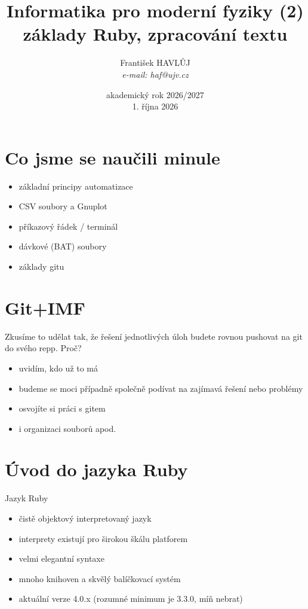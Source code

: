 \documentclass{beamer}
\title[IMF (2)]{Informatika pro moderní fyziky (2)\\základy Ruby, zpracování textu}
\author[Franti\v{s}ek HAVL\r{U}J, ORF ÚJV Řež]{Franti\v{s}ek HAVL\r{U}J\\{\scriptsize \emph{e-mail: haf@ujv.cz}}}
\date{akademický rok 2026/2027\\1. října 2026}
\institute[ORF ÚJV Řež]
{ÚJV Řež\\oddělení Reaktorové fyziky a podpory palivového cyklu}
\begin{document}
\begin{frame}
  \titlepage
\end{frame}

\begin{frame}
  \tableofcontents
\end{frame}

\section{Co jsme se naučili minule}

\begin{frame}{}
  \begin{itemize}
    \item základní principy automatizace
    \item CSV soubory a Gnuplot
    \item příkazový řádek / terminál
    \item dávkové (BAT) soubory
    \item základy gitu
  \end{itemize}
\end{frame}


\section{Git+IMF}

\begin{frame}{}
  Zkusíme to udělat tak, že řešení jednotlivých úloh budete rovnou pushovat na git do svého repp. Proč? 
  \begin{itemize}
    \item uvidím, kdo už to má
    \item budeme se moci případně společně podívat na zajímavá řešení nebo problémy
    \item osvojíte si práci s gitem
    \item i organizaci souborů apod.
  \end{itemize}
\end{frame}


\section{Úvod do jazyka Ruby}

\begin{frame}{Jazyk Ruby}
  \begin{itemize}
    \item čistě objektový interpretovaný jazyk
    \item interprety existují pro širokou škálu platforem
    \item velmi elegantní syntaxe
    \item mnoho knihoven a skvělý balíčkovací systém
    \item aktuální verze 4.0.x (rozumné minimum je 3.3.0, míň nebrat)
  \end{itemize}
\end{frame}
\end{document}
